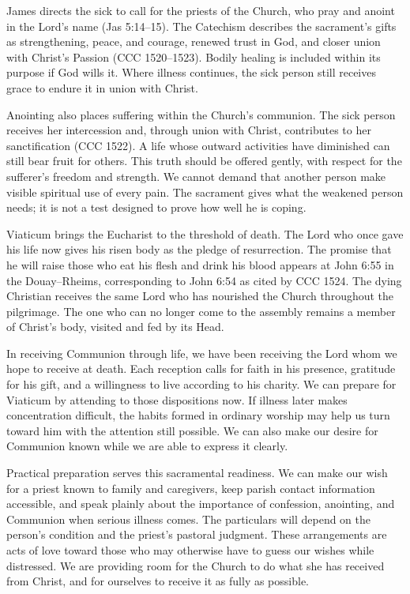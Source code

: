 James directs the sick to call for the priests of the Church, who pray and anoint in the Lord's name (Jas 5:14--15). The Catechism describes the sacrament's gifts as strengthening, peace, and courage, renewed trust in God, and closer union with Christ's Passion (CCC 1520--1523). Bodily healing is included within its purpose if God wills it. Where illness continues, the sick person still receives grace to endure it in union with Christ.

Anointing also places suffering within the Church's communion. The sick person receives her intercession and, through union with Christ, contributes to her sanctification (CCC 1522). A life whose outward activities have diminished can still bear fruit for others. This truth should be offered gently, with respect for the sufferer's freedom and strength. We cannot demand that another person make visible spiritual use of every pain. The sacrament gives what the weakened person needs; it is not a test designed to prove how well he is coping.

Viaticum brings the Eucharist to the threshold of death. The Lord who once gave his life now gives his risen body as the pledge of resurrection. The promise that he will raise those who eat his flesh and drink his blood appears at John 6:55 in the Douay--Rheims, corresponding to John 6:54 as cited by CCC 1524. The dying Christian receives the same Lord who has nourished the Church throughout the pilgrimage. The one who can no longer come to the assembly remains a member of Christ's body, visited and fed by its Head.

In receiving Communion through life, we have been receiving the Lord whom we hope to receive at death. Each reception calls for faith in his presence, gratitude for his gift, and a willingness to live according to his charity. We can prepare for Viaticum by attending to those dispositions now. If illness later makes concentration difficult, the habits formed in ordinary worship may help us turn toward him with the attention still possible. We can also make our desire for Communion known while we are able to express it clearly.

Practical preparation serves this sacramental readiness. We can make our wish for a priest known to family and caregivers, keep parish contact information accessible, and speak plainly about the importance of confession, anointing, and Communion when serious illness comes. The particulars will depend on the person's condition and the priest's pastoral judgment. These arrangements are acts of love toward those who may otherwise have to guess our wishes while distressed. We are providing room for the Church to do what she has received from Christ, and for ourselves to receive it as fully as possible.

